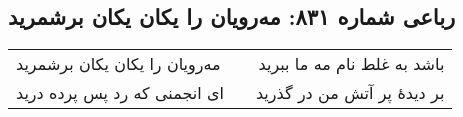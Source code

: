 \begin{center}
\section*{رباعی شماره ۸۳۱: مه‌رویان را یکان یکان برشمرید}
\label{sec:0831}
\begin{longtable}{l p{0.5cm} r}
مه‌رویان را یکان یکان برشمرید
&&
باشد به غلط نام مه ما ببرید
\\
ای انجمنی که رد پس پرده درید
&&
بر دیدهٔ پر آتش من در گذرید
\\
\end{longtable}
\end{center}
